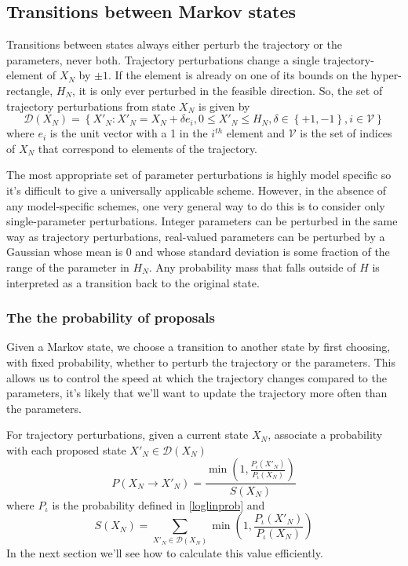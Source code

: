 \documentclass{article}
\begin{document}
\subsection{Transitions between Markov states}

Transitions between states always either perturb the trajectory or the parameters, never both. Trajectory perturbations change a single trajectory-element of $X_N$ by $\pm 1$. If the element is already on one of its bounds on the hyper-rectangle, $H_N$, it is only ever perturbed in the feasible direction. So, the set of trajectory perturbations from state $X_N$ is given by
\[
\mathcal{D}(X_N) = \left\{X'_N : X'_N = X_N + \delta e_i, 0 \le X'_N \le H_N, \delta \in \left\{+1,-1\right\}, i \in \mathcal{V} \right\}
\]
where $e_i$ is the unit vector with a 1 in the $i^{th}$ element and $\mathcal{V}$ is the set of indices of $X_N$ that correspond to elements of the trajectory.

The most appropriate set of parameter perturbations is highly model specific so it's difficult to give a universally applicable scheme. However, in the absence of any model-specific schemes, one very general way to do this is to consider only single-parameter perturbations. Integer parameters can be perturbed in the same way as trajectory perturbations, real-valued parameters can be perturbed by a Gaussian whose mean is 0 and whose standard deviation is some fraction of the range of the parameter in $H_N$. Any probability mass that falls outside of $H$ is interpreted as a transition back to the original state.

\subsubsection{The the probability of proposals}

Given a Markov state, we choose a transition to another state by first choosing, with fixed probability, whether to perturb the trajectory or the parameters. This allows us to control the speed at which the trajectory changes compared to the parameters, it's likely that we'll want to update the trajectory more often than the parameters.

For trajectory perturbations, given a current state $X_N$, associate a probability with each proposed state $X'_N \in \mathcal{D}(X_N)$
\begin{equation}
P(X_N \to X'_N) = \frac{\min\left(1, \frac{P_\iota(X'_N)}{P_\iota(X_N)}\right)}{S(X_N)} 
\label{transitionProb}
\end{equation}
where $P_\iota$ is the probability defined in \eqref{loglinprob} and
\begin{equation}
S(X_N) = \sum_{X'_N \in \mathcal{D}(X_N)} \min\left(1, \frac{P_\iota(X'_N)}{P_\iota(X_N)}\right)
\label{transitionSum}
\end{equation}
In the next section we'll see how to calculate this value efficiently.
\end{document}
